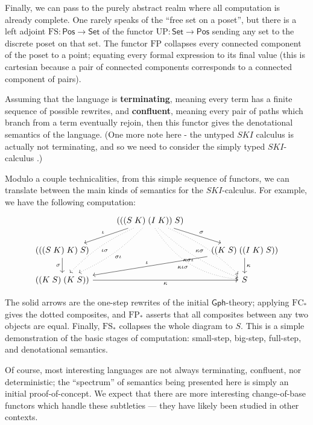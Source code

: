 \documentclass{amsart}
\theoremstyle{definition}
\newcommand{\Gph}{\mathsf{Gph}}
\newcommand{\Set}{\mathsf{Set}}
\newcommand{\Pos}{\mathsf{Pos}}
\newcommand{\FC}{\mathrm{FC}}
\newcommand{\FP}{\mathrm{FP}}
\newcommand{\FS}{\mathrm{FS}}
\newcommand{\UP}{\mathrm{UP}}
\newcommand{\maps}{\colon}
\begin{document}
Finally, we can pass to the purely abstract realm where all computation is already complete.   One rarely speaks of the ``free set on a poset'', but there is a left adjoint $\FS\maps \Pos \to \Set$ of the functor $\UP \maps \Set \to \Pos$ sending any set to the discrete poset on that set.
The functor $\FP$ collapses every connected component of the poset to a point; equating every formal expression to its final value (this is cartesian because a pair of connected components corresponds to a connected component of pairs).

Assuming that the language is \textbf{terminating}, meaning every term has a finite sequence of possible rewrites, and \textbf{confluent}, meaning every pair of paths which branch from a term eventually rejoin, then this functor gives the denotational semantics of the language. (One more note here - the untyped $SKI$ calculus is actually not terminating, and so we need to consider the simply typed $SKI$-calculus \cite{barendregt}.)

Modulo a couple technicalities, from this simple sequence of functors, we can translate between the main kinds of semantics for the $SKI$-calculus. For example, we have the following computation:
\[\begin{tikzcd}
&	(((S\; K)\; (I\; K))\; S) \arrow[rd,"\sigma"] \arrow[ld,swap,"\iota"] \arrow[ddl,dotted,bend left=10,"\sigma\iota"] \arrow[ddl,dotted,bend right=10,"\iota\sigma"] \arrow[ddr,dotted,swap,bend left=10,"\kappa\sigma"] \arrow[ddr,dotted,bend right=10,swap,"\kappa\sigma\iota"] \arrow[ddr,dotted,swap,bend right=25,"\kappa\iota\sigma"] &\\
(((S\; K)\; K)\; S) \arrow[d,swap,"\sigma"] & & ((K\; S)\; ((I\; K)\; S)) \arrow[lld,swap,"\iota"] \arrow[d,"\kappa"]\\
((K\; S)\; (K\; S)) \arrow[rr,swap,"\kappa"] & & S
\end{tikzcd}\]

The solid arrows are the one-step rewrites of the initial $\Gph$-theory; applying $\FC_*$ gives the dotted composites, and $\FP_*$ asserts that all composites between any two objects are equal. Finally, $\FS_*$ collapses the whole diagram to $S$. This is a simple demonstration of the basic stages of computation: small-step, big-step, full-step, and denotational semantics.

Of course, most interesting languages are not always terminating, confluent, nor deterministic; the ``spectrum'' of semantics being presented here is simply an initial proof-of-concept. We expect that there are more interesting change-of-base functors which handle these subtleties --- they have likely been studied in other contexts.
\end{document}
